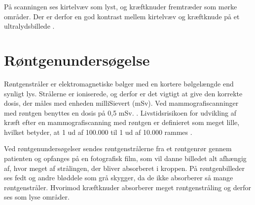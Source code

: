 På scanningen ses kirtelvæv som lyst, og kræftknuder fremtræder som mørke områder.  Der er derfor en god kontrast mellem kirtelvæv og kræftknude på et ultralydsbillede \citep{Ultralyd}.

\section{Røntgenundersøgelse}
Røntgenstråler er elektromagnetiske bølger med en kortere bølgelængde end synligt lys. Strålerne er ioniserede, og derfor er det vigtigt at give den korrekte dosis, der måles med enheden milliSievert (mSv). Ved mammografiscanninger med røntgen benyttes en dosis på 0,5 mSv. \cite{Sundhedsstyrelsen}. Livstidsrisikoen for udvikling af kræft efter en mammografiscanning med røntgen er definieret som meget lille, hvilket betyder, at 1 ud af 100.000 til 1 ud af 10.000 rammes \cite{Risk}. 

Ved røntgenundersøgelser sendes røntgenstrålerne fra et røntgenrør gennem patienten og opfanges på en fotografisk film, som vil danne billedet alt afhængig af, hvor meget af strålingen, der bliver absorberet i kroppen. På røntgenbilleder ses fedt og andre bløddele som grå skygger, da de ikke absorberer så mange røntgenstråler. Hvorimod kræftknuder absorberer meget røntgenstråling og derfor ses som lyse områder. \cite{Rontgenundersogelse}

